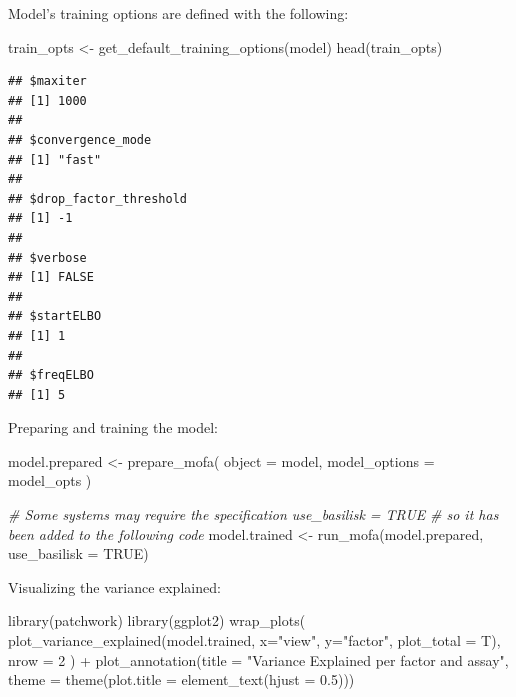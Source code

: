 \documentclass[
]{book}
\newenvironment{Shaded}{\begin{snugshade}}{\end{snugshade}}
\newcommand{\AttributeTok}[1]{\textcolor[rgb]{0.77,0.63,0.00}{#1}}
\newcommand{\CommentTok}[1]{\textcolor[rgb]{0.56,0.35,0.01}{\textit{#1}}}
\newcommand{\ConstantTok}[1]{\textcolor[rgb]{0.00,0.00,0.00}{#1}}
\newcommand{\DecValTok}[1]{\textcolor[rgb]{0.00,0.00,0.81}{#1}}
\newcommand{\FloatTok}[1]{\textcolor[rgb]{0.00,0.00,0.81}{#1}}
\newcommand{\FunctionTok}[1]{\textcolor[rgb]{0.00,0.00,0.00}{#1}}
\newcommand{\NormalTok}[1]{#1}
\newcommand{\OtherTok}[1]{\textcolor[rgb]{0.56,0.35,0.01}{#1}}
\newcommand{\SpecialCharTok}[1]{\textcolor[rgb]{0.00,0.00,0.00}{#1}}
\newcommand{\StringTok}[1]{\textcolor[rgb]{0.31,0.60,0.02}{#1}}
\begin{document}
Model's training options are defined with the following:

\begin{Shaded}
\begin{Highlighting}[]
\NormalTok{train\_opts }\OtherTok{\textless{}{-}} \FunctionTok{get\_default\_training\_options}\NormalTok{(model)}
\FunctionTok{head}\NormalTok{(train\_opts)}
\end{Highlighting}
\end{Shaded}

\begin{verbatim}
## $maxiter
## [1] 1000
## 
## $convergence_mode
## [1] "fast"
## 
## $drop_factor_threshold
## [1] -1
## 
## $verbose
## [1] FALSE
## 
## $startELBO
## [1] 1
## 
## $freqELBO
## [1] 5
\end{verbatim}

Preparing and training the model:

\begin{Shaded}
\begin{Highlighting}[]
\NormalTok{model.prepared }\OtherTok{\textless{}{-}} \FunctionTok{prepare\_mofa}\NormalTok{(}
  \AttributeTok{object =}\NormalTok{ model,}
  \AttributeTok{model\_options =}\NormalTok{ model\_opts}
\NormalTok{)}

\CommentTok{\# Some systems may require the specification \textasciigrave{}use\_basilisk = TRUE\textasciigrave{}}
\CommentTok{\# so it has been added to the following code}
\NormalTok{model.trained }\OtherTok{\textless{}{-}} \FunctionTok{run\_mofa}\NormalTok{(model.prepared, }\AttributeTok{use\_basilisk =} \ConstantTok{TRUE}\NormalTok{)}
\end{Highlighting}
\end{Shaded}

Visualizing the variance explained:

\begin{Shaded}
\begin{Highlighting}[]
\FunctionTok{library}\NormalTok{(patchwork)}
\FunctionTok{library}\NormalTok{(ggplot2)}
\FunctionTok{wrap\_plots}\NormalTok{(}
    \FunctionTok{plot\_variance\_explained}\NormalTok{(model.trained, }\AttributeTok{x=}\StringTok{"view"}\NormalTok{, }\AttributeTok{y=}\StringTok{"factor"}\NormalTok{, }\AttributeTok{plot\_total =}\NormalTok{ T),}
    \AttributeTok{nrow =} \DecValTok{2}
\NormalTok{) }\SpecialCharTok{+} \FunctionTok{plot\_annotation}\NormalTok{(}\AttributeTok{title =} \StringTok{"Variance Explained per factor and assay"}\NormalTok{,}
                    \AttributeTok{theme =} \FunctionTok{theme}\NormalTok{(}\AttributeTok{plot.title =} \FunctionTok{element\_text}\NormalTok{(}\AttributeTok{hjust =} \FloatTok{0.5}\NormalTok{)))}
\end{Highlighting}
\end{Shaded}
\end{document}
